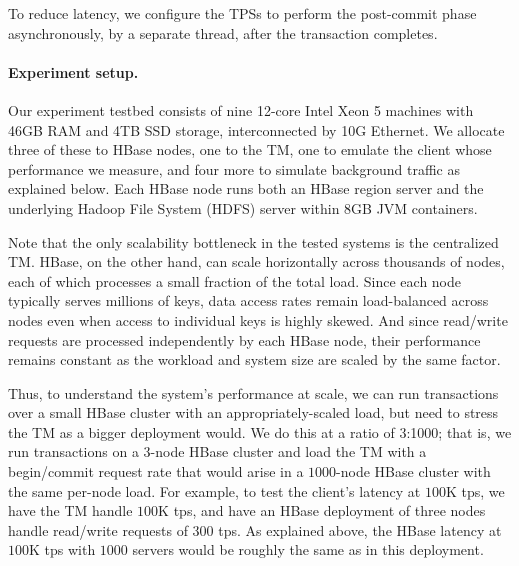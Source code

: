 To reduce latency, we configure the TPSs to perform the post-commit phase asynchronously, 
by a separate thread, after the transaction completes.


\paragraph{Experiment setup.}

Our experiment testbed consists of nine 12-core Intel Xeon 5 machines with 46GB RAM and 4TB 
SSD storage, interconnected by 10G Ethernet. We allocate three of these to HBase nodes, 
one to the TM, one to emulate the client whose performance we measure, and four more to simulate 
background traffic as explained below. Each HBase node runs both an HBase region server and 
the underlying Hadoop File System (HDFS) server within 8GB JVM containers. 

Note that the only scalability bottleneck in the tested systems is the centralized TM.
HBase, on the other hand, can scale horizontally across thousands of nodes, each of which processes a small fraction of the total load. 
Since each node typically serves millions of  keys, data access rates remain load-balanced across nodes 
even when access to individual keys is highly skewed.  And since read/write requests are processed independently by each HBase node, 
their performance remains constant as the workload and  system size are scaled by the same factor. 

Thus, to understand the system's performance at scale, 
we can run transactions over a small HBase cluster with an appropriately-scaled load, 
but need to stress the TM as a bigger deployment would. 
We do this at a ratio of 3:1000; that is, we run transactions on a $3$-node HBase cluster and 
load the TM with a begin/commit request rate that would arise in a $1000$-node HBase cluster with the same per-node load.
For example, to test the client's latency at $100$K tps, we have the TM handle $100$K tps, and have  an HBase deployment of
three nodes handle read/write requests of $300$ tps. As explained above, 
the HBase latency at $100$K tps with $1000$ servers would be roughly the same as in this deployment.


